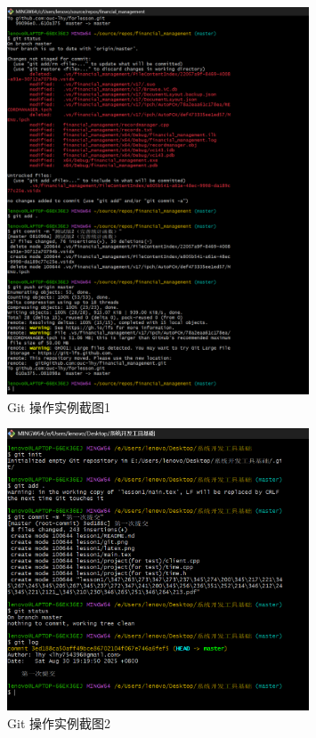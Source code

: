 \documentclass[a4paper, 12pt]{article}
\begin{document}
\begin{enumerate}
    \begin{figure}[htbp]
        \centering
        \includegraphics[width=0.8\textwidth]{git (1).png}
        \vspace{0.3cm} %
        \caption{Git 操作实例截图1}
        \label{fig:git-screenshot1}
    \end{figure}

    \begin{figure}[htbp]
        \centering
        \includegraphics[width=0.8\textwidth]{git (2).png}
        \vspace{0.3cm} %
        \caption{Git 操作实例截图2}
        \label{fig:git-screenshot2}
    \end{figure}


\end{enumerate}
\end{document}
